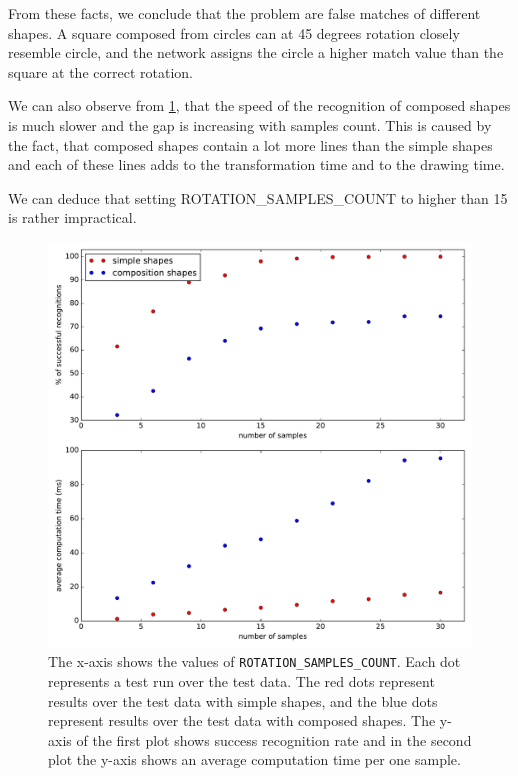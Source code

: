 From these facts, we conclude that the problem are false matches of different shapes. A square composed from circles can at 45 degrees rotation closely resemble circle, and the network assigns the circle a higher match value than the square at the correct rotation. 

We can also observe from \cref{fig:rotation}, that the speed of the recognition of composed shapes is much slower and the gap is increasing with samples count. This is caused by the fact, that composed shapes contain a lot more lines than the simple shapes and each of these lines adds to the transformation time and to the drawing time.

We can deduce that setting ROTATION\_SAMPLES\_COUNT to higher than 15 is rather impractical.

\begin{figure}
\centering
\includegraphics[width=\linewidth]{ext/rotation_cmb.pdf}
\caption{The x-axis shows the values of \texttt{ROTATION\_SAMPLES\_COUNT}. Each dot represents a test run over the test data. The red dots represent results over the test data with simple shapes, and the blue dots represent results over the test data with composed shapes. The y-axis of the first plot shows success recognition rate and in the second plot the y-axis shows an average computation time per one sample.}
\label{fig:rotation}
\end{figure}


